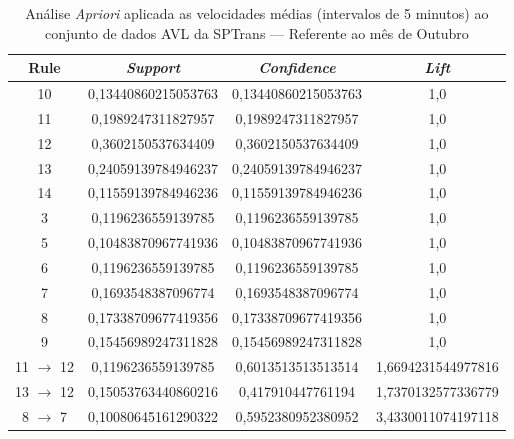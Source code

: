 \documentclass[
	12pt,				%
	oneside,			%
	a4paper,			%
	english,			%
	brazil				%
	]{abntex2ppgsi}
\begin{document}
\begin{apendicesenv}
\begin{table}[!htb]
\centering
\caption {Análise \textit{Apriori} aplicada as velocidades médias (intervalos de 5 minutos) ao conjunto de dados AVL da SPTrans --- Referente ao mês de Outubro}
\label {tab:aprioriOctober}
\begin{tabular}{c|c|c|c}
\hline
\textbf{Rule} & \textit{\textbf{Support}} & \textit{\textbf{Confidence}} & \textit{\textbf{Lift}} \\
\hline
10 &  0,13440860215053763 &  0,13440860215053763 &  1,0\\
\hline
11 &  0,1989247311827957 &  0,1989247311827957 &  1,0\\
\hline
12 &  0,3602150537634409 &  0,3602150537634409 &  1,0\\
\hline
13 &  0,24059139784946237 &  0,24059139784946237 &  1,0\\
\hline
14 &  0,11559139784946236 &  0,11559139784946236 &  1,0\\
\hline
3 &  0,1196236559139785 &  0,1196236559139785 &  1,0\\
\hline
5 &  0,10483870967741936 &  0,10483870967741936 &  1,0\\
\hline
6 &  0,1196236559139785 &  0,1196236559139785 &  1,0\\
\hline
7 &  0,1693548387096774 &  0,1693548387096774 &  1,0\\
\hline
8 &  0,17338709677419356 &  0,17338709677419356 &  1,0\\
\hline
9 &  0,15456989247311828 &  0,15456989247311828 &  1,0\\
\hline
11 $\rightarrow$ 12 &  0,1196236559139785 &  0,6013513513513514 &  1,6694231544977816\\
\hline
13 $\rightarrow$ 12 &  0,15053763440860216 &  0,417910447761194 &  1,7370132577336779\\
\hline
8 $\rightarrow$ 7 &  0,10080645161290322 &  0,5952380952380952 &  3,4330011074197118\\
\hline
\end{tabular}
\end{table}



\end{apendicesenv}
\end{document}
